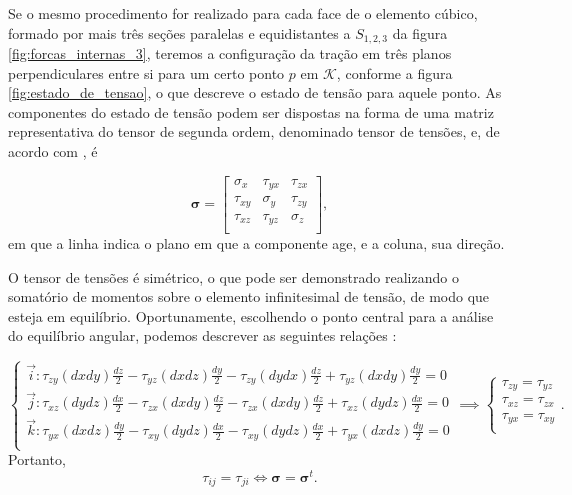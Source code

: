 Se o mesmo procedimento for realizado para cada face de o elemento cúbico, formado por mais três seções paralelas e equidistantes a $S_{1,2,3}$ da figura \ref{fig:forcas_internas_3}, teremos a configuração da tração em três planos perpendiculares entre si para um certo ponto $p$ em $\mathcal{K}$,  conforme a figura \ref{fig:estado_de_tensao}, o que descreve o estado de tensão para aquele ponto. As componentes do estado de tensão podem ser dispostas na forma de uma matriz representativa do tensor de segunda ordem, denominado tensor de tensões, e, de acordo com , é

\begin{equation}
    \bm{\sigma} =
    \begin{bmatrix}
        \sigma_x & \tau_{yx} & \tau_{zx} \\
        \tau_{xy} & \sigma_{y} & \tau_{zy} \\
        \tau_{xz} & \tau_{yz} & \sigma_{z} \\
    \end{bmatrix},
\end{equation}
em que a linha indica o plano em que a componente age, e a coluna, sua direção.

O tensor de tensões é simétrico, o que pode ser demonstrado realizando o somatório de momentos sobre o elemento infinitesimal de tensão, de modo que esteja em equilíbrio. Oportunamente, escolhendo o ponto central para a análise do equilíbrio angular, podemos descrever as seguintes relações \cite[pág. 8]{popov}:

\begin{equation}
    \begin{cases}
        \displaystyle  \vec{i} : \tau_{zy} (dxdy) \frac{dz}{2} - \tau_{yz} (dx dz) \frac{dy}{2} - \tau_{zy} (dydx) \frac{dz}{2}+ \tau_{yz} (dxdy) \frac{dy}{2} = 0 \\

        \displaystyle  \vec{j} : \tau_{xz} (dydz) \frac{dx}{2} - \tau_{zx} (dx dy) \frac{dz}{2} - \tau_{zx} (dx dy) \frac{dz}{2} + \tau_{xz} (dydz) \frac{dx}{2} = 0 \\

        
        \displaystyle  \vec{k} : \tau_{yx} (dxdz) \frac{dy}{2} - \tau_{xy} (dydz) \frac{dx}{2} - \tau_{xy} (dydz) \frac{dx}{2} + \tau_{yx} (dxdz) \frac{dy}{2} = 0 \\

    \end{cases} \implies
    \begin{cases}
        \tau_{zy} = \tau_{yz} \\
        \tau_{xz} = \tau_{zx} \\
        \tau_{yx} = \tau_{xy} \\
    \end{cases}.
\end{equation}
Portanto,
\begin{equation}
    \tau_{ij} = \tau_{ji} \iff \bm{\sigma} = \bm{\sigma}^t.
\end{equation}

